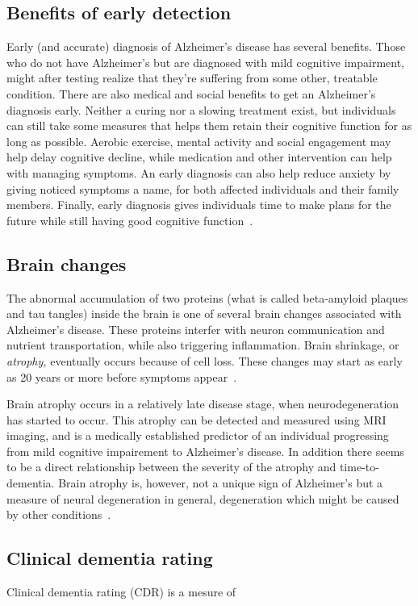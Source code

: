 \documentclass{kththesis}
\begin{document}
\subsection{Benefits of early detection}
Early (and accurate) diagnosis of Alzheimer's disease has several benefits. Those who do not have Alzheimer's but are diagnosed with mild cognitive impairment, might after testing realize that they're suffering from some other, treatable condition. There are also medical and social benefits to get an Alzheimer's diagnosis early. Neither a curing nor a slowing treatment exist, but individuals can still take some measures that helps them retain their cognitive function for as long as possible. Aerobic exercise, mental activity and social engagement may help delay cognitive decline, while medication and other intervention can help with managing symptoms. An early diagnosis can also help reduce anxiety by giving noticed symptoms a name, for both affected individuals and their family members. Finally, early diagnosis gives individuals time to make plans for the future while still having good cognitive function~\cite[p. 406-409]{factsfigures2018}.

\subsection{Brain changes}
The abnormal accumulation of two proteins (what is called beta-amyloid plaques and tau tangles) inside the brain is one of several brain changes associated with Alzheimer's disease. These proteins interfer with neuron communication and nutrient transportation, while also triggering inflammation. Brain shrinkage, or \textit{atrophy,} eventually occurs because of cell loss. These changes may start as early as 20 years or more before symptoms appear~\cite{factsfigures2018}.

Brain atrophy occurs in a relatively late disease stage, when neurodegeneration has started to occur. This atrophy can be detected and measured using MRI imaging, and is a medically established predictor of an individual progressing from mild cognitive impairement to Alzheimer's disease. In addition there seems to be a direct relationship between the severity of the atrophy and time-to-dementia. Brain atrophy is, however, not a unique sign of Alzheimer's but a measure of neural degeneration in general, degeneration which might be caused by other conditions~\cite{jack2010brain}.

\subsection{Clinical dementia rating}
Clinical dementia rating (CDR) is a mesure of
\end{document}

